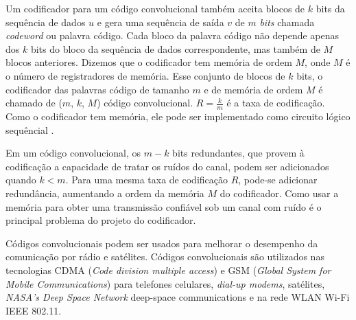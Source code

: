 Um codificador para um código convolucional também aceita blocos de $k$ bits da sequência de dados $u$ e gera uma sequência de saída $v$ de $m$ \emph{bits} chamada \emph{codeword} ou palavra código. Cada bloco da palavra código não depende apenas dos $k$ bits do bloco da sequência de dados correspondente, mas também de $M$ blocos anteriores. Dizemos que o codificador tem memória de ordem $M$, onde $M$ é o número de registradores de memória. Esse conjunto de blocos de $k$ bits, o codificador das palavras código de tamanho $m$ e de memória de ordem $M$ é chamado de ($m$, $k$, $M$) código convolucional. $R = \frac{k}{m}$  é a taxa de codificação. Como o codificador tem memória, ele pode ser implementado como circuito lógico sequêncial \cite{Lin:1983}.

Em um código convolucional, os $m - k$ bits redundantes, que provem à codificação a capacidade de tratar os ruídos do canal, podem ser adicionados quando $k < m$. Para uma mesma taxa de codificação $R$, pode-se adicionar redundância, aumentando a ordem da memória $M$ do codificador. Como usar a memória para obter uma transmissão confiável sob um canal com ruído é o principal problema do projeto do codificador.

Códigos convolucionais podem ser usados para melhorar o desempenho da comunicação por rádio e satélites. Códigos convolucionais são utilizados nas tecnologias CDMA (\emph{Code division multiple access}) e GSM (\emph{Global System for Mobile Communications}) para telefones celulares, \emph{dial-up modems}, satélites, \emph{NASA's Deep Space Network} deep-space communications e na rede WLAN Wi-Fi IEEE 802.11.


